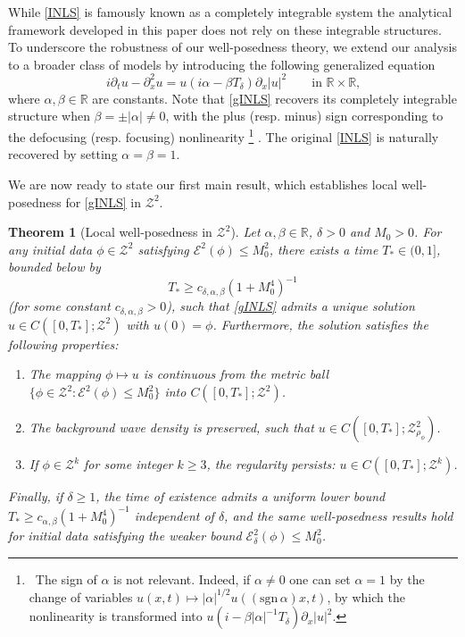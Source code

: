 \documentclass{amsart}
\newtheorem{theorem}{Theorem}[section]
\numberwithin{equation}{section}
\newcommand{\R}{\mathbb{R}}
\newcommand{\Td}{T_{\delta}}
\begin{document}
While \eqref{INLS} is famously known as a completely integrable system \cite{PG,CFL} the analytical framework developed in this paper does not rely on these integrable structures. 
To underscore the robustness of our well-posedness theory, we extend our analysis to a broader class of models by introducing the following generalized equation
\begin{equation}\label{gINLS}\tag{gINLS}
i\partial_tu-\partial_x^2u=u(i\alpha -\beta T_\delta)\partial_x|u|^2 \qquad \text{in $\mathbb{R}\times \mathbb{R}$,}
\end{equation}
where $\alpha,\beta\in \R$ are constants. 
Note that \eqref{gINLS} recovers its completely integrable structure when $\beta =\pm |\alpha|\neq 0$, with the plus (resp. minus) sign corresponding to the defocusing (resp. focusing) nonlinearity%
\footnote{~The sign of $\alpha$ is not relevant. Indeed, if $\alpha \neq 0$ one can set $\alpha =1$ by the change of variables $u(x,t)\mapsto |\alpha |^{1/2}u((\text{sgn}\,{\alpha})x,t)$, by which the nonlinearity is transformed into $u(i-\beta |\alpha|^{-1}\Td)\partial_x|u|^2$.}%
. 
The original \eqref{INLS} is naturally recovered by setting $\alpha =\beta =1$.

\medskip
We are now ready to state our first main result, which establishes local well-posedness for \eqref{gINLS} in $\mathcal{Z}^2$.

\begin{theorem}[Local well-posedness in $\mathcal{Z}^2$]\label{thm:LWP}
Let $\alpha, \beta\in \R$, $\delta>0$ and $M_0>0$. 
For any initial data $\phi\in \mathcal{Z}^2$ satisfying $\mathcal{E}^2(\phi)\leq M_0^2$, there exists a time $T_*\in (0,1]$, bounded below by
\[ T_*\geq c_{\delta,\alpha,\beta}(1+M_0^4)^{-1} \]
(for some constant $c_{\delta,\alpha,\beta}>0$), such that \eqref{gINLS} admits a unique solution $u\in C([0,T_*];\mathcal{Z}^2)$ with $u(0)=\phi$. 
Furthermore, the solution satisfies the following properties:
\begin{enumerate}
\item[{\upshape (i)}] The mapping $\phi\mapsto u$ is continuous from the metric ball $\{ \phi\in \mathcal{Z}^2\colon\mathcal{E}^2(\phi)\leq M_0^2\}$ into $C([0,T_*];\mathcal{Z}^2)$.
\item[{\upshape (ii)}] The background wave density is preserved, such that $u\in C([0,T_*];\mathcal{Z}^2_{\rho_\phi})$.
\item[{\upshape (iii)}] If $\phi\in \mathcal{Z}^k$ for some integer $k\geq 3$, the regularity persists: $u\in C([0,T_*];\mathcal{Z}^k)$.
\end{enumerate}
Finally, if $\delta\geq 1$, the time of existence admits a uniform lower bound $T_*\geq c_{\alpha,\beta}(1+M_0^4)^{-1}$ independent of $\delta$, and the same well-posedness results hold for initial data satisfying the weaker bound $\mathcal{E}^2_\delta(\phi)\leq M_0^2$.
\end{theorem}
\end{document}
